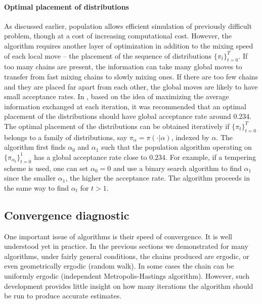 \paragraph{Optimal placement of distributions}

As discussed earlier, population \mcmc allows efficient simulation of previously difficult problem, though at a cost of increasing computational cost. However, the algorithm requires another layer of optimization in addition to the mixing speed of each local move -- the placement of the sequence of distributions $\{\pi_t\}_{t=0}^T$. If too many chains are present, the information can take many global moves to transfer from fast mixing chains to slowly mixing ones. If there are too few chains and they are placed far apart from each other, the global moves are likely to have small acceptance rates. In \cite{Atchade:2010ha}, based on the idea of maximizing the average information exchanged at each iteration, it was recommended that an optimal placement of the distributions should have global acceptance rate  around $0.234$. The optimal placement of the distributions can be obtained iteratively if $\{\pi_t\}_{t=0}^T$ belongs to a family of distributions, say $\pi_{\alpha} = \pi(\cdot|\alpha)$, indexed by $\alpha$. The algorithm first finds $\alpha_0$ and $\alpha_1$ such that the population \mcmc algorithm operating on $\{\pi_{\alpha_t}\}_{t=0}^1$ has a global acceptance rate close to $0.234$. For example, if a tempering scheme is used, one can set $\alpha_0 = 0$ and use a binary search algorithm to find $\alpha_1$ since the smaller $\alpha_1$, the higher the acceptance rate. The algorithm proceeds in the same way to find $\alpha_t$ for $t>1$.

\subsection{Convergence diagnostic}
\label{sub:Convergence diagnostic}

One important issue of \mcmc algorithms is their speed of convergence. It is well understood yet   in practice. In the previous sections we demonstrated for many algorithms, under fairly general conditions, the chains produced are ergodic, or even geometrically ergodic (random walk). In some cases the chain can be uniformly ergodic (independent Metropolis-Hastings algorithm). However, such development provides little insight on how many iterations the algorithm should be run to produce accurate estimates.

